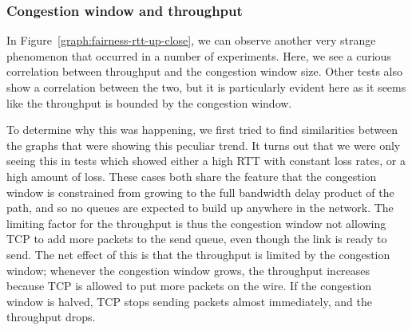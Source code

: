 \subsubsection{Congestion window and throughput}

In Figure~\ref{graph:fairness-rtt-up-close}, we can observe another very strange
phenomenon that occurred in a number of experiments. Here, we see a curious
correlation between throughput and the congestion window size. Other tests also
show a correlation between the two, but it is particularly evident here as it 
seems like the throughput is bounded by the congestion window.

To determine why this was happening, we first tried to find similarities
between the graphs that were showing this peculiar trend. It turns out that we
were only seeing this in tests which showed either a high RTT with constant loss
rates, or a high amount of loss. These cases both share the feature that the
congestion window is constrained from growing to the full bandwidth delay
product of the path, and so no queues are expected to build up anywhere in the
network. The limiting factor for the throughput is thus the congestion window not
allowing TCP to add more packets to the send queue, even though the link is
ready to send. The net effect of this is that the throughput is limited by the
congestion window; whenever the congestion window grows, the throughput
increases because TCP is allowed to put more packets on the wire. If the
congestion window is halved, TCP stops sending packets almost immediately, and
the throughput drops.
